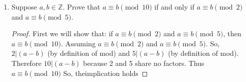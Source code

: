 \documentclass{article}
\newcommand{\ints}{\mathbb{Z}}
\begin{document}
\begin{enumerate}
\begin{proof}
			\textbf{case 2:} $y = x^2$ \\
			Consider $x^4 + x^3$, 
			\begin{align*}
				x^4+x^3 &= x^4 + x^3\\
				        &= (x^2)^2+(x^2)x & \text{(by factoring)}\\
				        &= y^2+yx & \text{(by substitution)}\\
				        \\
			x^4+x^3 &= x^4 + x^3\\
					&= x^2(x^2)+x^3 & \text{(by factoring)}\\
					&= x^2y+x^3 & \text{(by substitution)}.
			\end{align*} 
			Thus, $x^3+x^2y =y^3+xy$ when $y=x^2$. 
			since both cases hold so does the implication.
			
			next consider the implication: if $x^3 + x^2y=y^2 +xy$, then  $y = x^2$ or $y = -x$.
			Assume for the sake of contradiction that:
			$x^3 + x^2y=y^2 +xy$ and $y \neq x^2$ and $y \neq -x$. 
			Since,
			\begin{align*}
				x^3 + x^2y &= y^2 +xy\\
				x^2(x+y) &= y(x+y) & \text{(by factoring)}\\
				\frac{x^2(x+y)}{(x+y)} &= \frac{y(x+y)}{(x+y)} & \text{(since } y \neq -x\text{)}\ \\
				x^2 &= y.
			\end{align*}
			Which is a contradiction therefore the implication holds.
			
			Since, $y = x^2$ or $y = -x$, implies $x^3 + x^2y=y^2 +xy$ and $x^3 + x^2y=y^2 +xy$, implies $y = x^2$ or $y = -x$ the original statement holds
			
		\end{proof}
		
		
		
		\setcounter{enumi}{7}
		\item Suppose $a,b \in \ints$. Prove that $a \equiv b \pmod{10}$ if and only if  $a \equiv b \pmod{2}$ and $a \equiv b \pmod{5}$.
		\begin{proof}
			First we will show that: if  $a \equiv b \pmod{2}$ and $a \equiv b \pmod{5}$, then  $a \equiv b \pmod{10}$. Assuming $a \equiv b \pmod{2}$ and $a \equiv b \pmod{5}$. So, $2|(a-b)$ (by definition of mod) and $5|(a-b)$ (by definition of mod). Therefore  $10|(a-b)$ because 2 and 5 share no factors. Thus $a \equiv b \pmod{10}$ So, theimplication holds  
		

\end{proof}
\end{enumerate}
\end{document}
